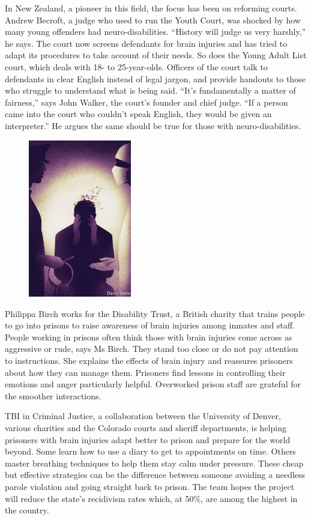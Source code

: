 \documentclass{article}
\begin{document}
In New Zealand, a pioneer in this field, the focus has been on reforming courts. Andrew Becroft, a judge who used to run the Youth Court, was shocked by how many young offenders had neuro-disabilities. ``History will judge us very harshly,'' he says. The court now screens defendants for brain injuries and has tried to adapt its procedures to take account of their needs. So does the Young Adult List court, which deals with 18- to 25-year-olds. Officers of the court talk to defendants in clear English instead of legal jargon, and provide handouts to those who struggle to understand what is being said. ``It's fundamentally a matter of fairness,'' says John Walker, the court's founder and chief judge. ``If a person came into the court who couldn't speak English, they would be given an interpreter.'' He argues the same should be true for those with neuro-disabilities. 

\begin{figure}[h]
\centering
\includegraphics[width=0.4\textwidth]{images/20210327_IRD002_0.jpg}
\end{figure}


Philippa Birch works for the Disability Trust, a British charity that trains people to go into prisons to raise awareness of brain injuries among inmates and staff. People working in prisons often think those with brain injuries come across as aggressive or rude, says Ms Birch. They stand too close or do not pay attention to instructions. She explains the effects of brain injury and reassures prisoners about how they can manage them. Prisoners find lessons in controlling their emotions and anger particularly helpful. Overworked prison staff are grateful for the smoother interactions. 

TBI in Criminal Justice, a collaboration between the University of Denver, various charities and the Colorado courts and sheriff departments, is helping prisoners with brain injuries adapt better to prison and prepare for the world beyond. Some learn how to use a diary to get to appointments on time. Others master breathing techniques to help them stay calm under pressure. These cheap but effective strategies can be the difference between someone avoiding a needless parole violation and going straight back to prison. The team hopes the project will reduce the state's recidivism rates which, at 50\%, are among the highest in the country. 
\end{document}
